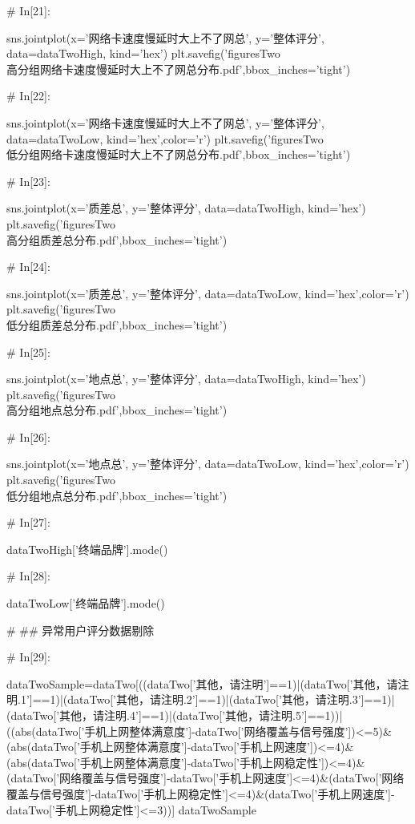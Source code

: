 \documentclass{MathorCupmodeling}
\begin{document}
\begin{python}
# In[21]:


sns.jointplot(x='网络卡速度慢延时大上不了网总', y='整体评分', data=dataTwoHigh, kind='hex')
plt.savefig('figuresTwo\\[附件2]高分组网络卡速度慢延时大上不了网总分布.pdf',bbox_inches='tight')


# In[22]:


sns.jointplot(x='网络卡速度慢延时大上不了网总', y='整体评分', data=dataTwoLow, kind='hex',color='r')
plt.savefig('figuresTwo\\[附件2]低分组网络卡速度慢延时大上不了网总分布.pdf',bbox_inches='tight')


# In[23]:


sns.jointplot(x='质差总', y='整体评分', data=dataTwoHigh, kind='hex')
plt.savefig('figuresTwo\\[附件2]高分组质差总分布.pdf',bbox_inches='tight')


# In[24]:


sns.jointplot(x='质差总', y='整体评分', data=dataTwoLow, kind='hex',color='r')
plt.savefig('figuresTwo\\[附件2]低分组质差总分布.pdf',bbox_inches='tight')


# In[25]:


sns.jointplot(x='地点总', y='整体评分', data=dataTwoHigh, kind='hex')
plt.savefig('figuresTwo\\[附件2]高分组地点总分布.pdf',bbox_inches='tight')


# In[26]:


sns.jointplot(x='地点总', y='整体评分', data=dataTwoLow, kind='hex',color='r')
plt.savefig('figuresTwo\\[附件2]低分组地点总分布.pdf',bbox_inches='tight')


# In[27]:


dataTwoHigh['终端品牌'].mode()


# In[28]:


dataTwoLow['终端品牌'].mode()


# ## 异常用户评分数据剔除

# In[29]:


dataTwoSample=dataTwo[((dataTwo['其他，请注明']==1)|(dataTwo['其他，请注明.1']==1)|(dataTwo['其他，请注明.2']==1)|(dataTwo['其他，请注明.3']==1)|(dataTwo['其他，请注明.4']==1)|(dataTwo['其他，请注明.5']==1))|((abs(dataTwo['手机上网整体满意度']-dataTwo['网络覆盖与信号强度'])<=5)&(abs(dataTwo['手机上网整体满意度']-dataTwo['手机上网速度'])<=4)&(abs(dataTwo['手机上网整体满意度']-dataTwo['手机上网稳定性'])<=4)&(dataTwo['网络覆盖与信号强度']-dataTwo['手机上网速度']<=4)&(dataTwo['网络覆盖与信号强度']-dataTwo['手机上网稳定性']<=4)&(dataTwo['手机上网速度']-dataTwo['手机上网稳定性']<=3))]
dataTwoSample



\end{python}
\end{document}
